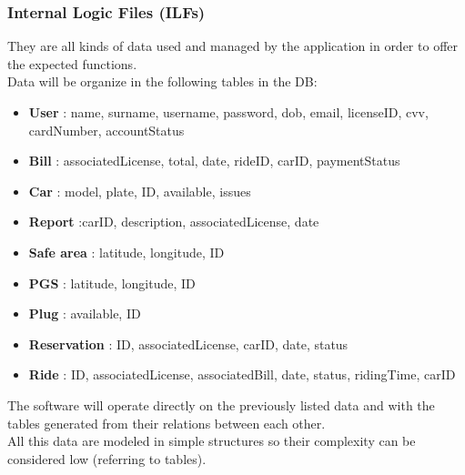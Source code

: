 \documentclass[english]{article}
\begin{document}

\subsubsection{Internal Logic Files (ILFs)}

They are all kinds of data used and managed by the application in  order to offer the expected functions.\\
Data will be organize in the following tables in the DB:

\begin{itemize}

	\item \textbf{User} : name, surname, username, password, dob, email, licenseID, cvv, cardNumber, accountStatus

	\item \textbf{Bill} : associatedLicense, total, date, rideID, carID, paymentStatus

	\item \textbf{Car} : model, plate, ID, available, issues

	\item \textbf{Report} :carID, description, associatedLicense, date

	\item \textbf{Safe area} : latitude, longitude, ID

	\item \textbf{PGS} : latitude, longitude, ID

	\item \textbf{Plug} : available, ID

	\item \textbf{Reservation} : ID, associatedLicense, carID, date, status

	\item \textbf{Ride} : ID, associatedLicense, associatedBill, date, status, ridingTime, carID

\end{itemize}

The software will operate directly on the previously listed data and with the tables generated from their relations between each other.\\
All this data are modeled in simple structures so their complexity can be considered low (referring to tables).
\end{document}
